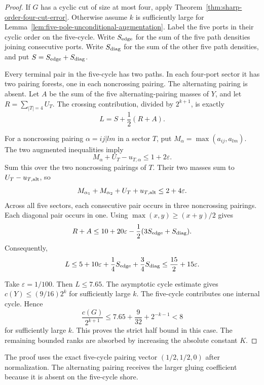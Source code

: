 \begin{proof}
If $G$ has a cyclic cut of size at most four, apply Theorem~\ref{thm:sharp-order-four-cut-error}.
Otherwise assume $k$ is sufficiently large for Lemma~\ref{lem:five-pole-unconditional-augmentation}.
Label the five ports in their cyclic order on the five-cycle.
Write $S_{\rm edge}$ for the sum of the five path densities joining consecutive ports.
Write $S_{\rm diag}$ for the sum of the other five path densities, and put $S=S_{\rm edge}+S_{\rm diag}$.

Every terminal pair in the five-cycle has two paths.
In each four-port sector it has two pairing forests, one in each noncrossing pairing.
The alternating pairing is absent.
Let $A$ be the sum of the five alternating-pairing masses of $Y$, and let $R=\sum_{|T|=4}U_T$.
The crossing contribution, divided by $2^{k+1}$, is exactly
\[
 L=S+\frac12(R+A).
\]

For a noncrossing pairing $\alpha=ij|lm$ in a sector $T$, put $M_\alpha=\max(a_{ij},a_{lm})$.
The two augmented inequalities imply
\[
 M_\alpha+U_T-u_{T,\alpha}\le1+2\varepsilon.
\]
Sum this over the two noncrossing pairings of $T$.
Their two masses sum to $U_T-u_{T,\rm alt}$, so
\[
 M_{\alpha_1}+M_{\alpha_2}+U_T+u_{T,\rm alt}\le2+4\varepsilon.
\]
Across all five sectors, each consecutive pair occurs in three noncrossing pairings.
Each diagonal pair occurs in one.
Using $\max(x,y)\ge(x+y)/2$ gives
\[
 R+A\le10+20\varepsilon-\frac12(3S_{\rm edge}+S_{\rm diag}).
\]
Consequently,
\[
 L\le5+10\varepsilon+\frac14S_{\rm edge}+\frac34S_{\rm diag}
 \le\frac{15}{2}+15\varepsilon.
\]

Take $\varepsilon=1/100$.
Then $L\le7.65$.
The asymptotic cycle estimate gives $c(Y)\le(9/16)2^k$ for sufficiently large $k$.
The five-cycle contributes one internal cycle.
Hence
\[
 \frac{c(G)}{2^{k+1}}
 \le7.65+\frac9{32}+2^{-k-1}<8
\]
for sufficiently large $k$.
This proves the strict half bound in this case.
The remaining bounded ranks are absorbed by increasing the absolute constant $K$.
\end{proof}

The proof uses the exact five-cycle pairing vector $(1/2,1/2,0)$ after normalization.
The alternating pairing receives the larger gluing coefficient because it is absent on the five-cycle shore.
